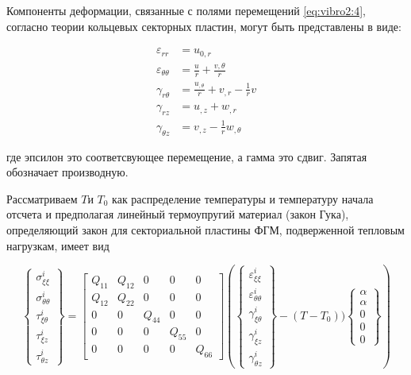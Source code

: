 Компоненты деформации, связанные с полями перемещений \cref{eq:vibro2:4}, согласно теории кольцевых секторных пластин, могут быть представлены в виде:

\begin{equation}
	\label{eq:vibro1:5}
	\begin{split}
		\varepsilon_{rr} &= u_{0, r}
		\\
		\varepsilon_{\theta \theta } &= \frac{u}{r}+\frac{v{,\theta}}{r}
		\\
		\gamma_{r \theta} &= \frac{u_{, \theta}}{r}+v_{, r} - \frac{1}{r}v
		\\
		\gamma_{r z } &= u_{,z}+w_{,r}
		\\
		\gamma_{\theta z} &= v_{,z}-\frac{1}{r} w_{,\theta} 
	\end{split}
\end{equation}

где эпсилон это соответсвующее перемещение, а гамма это сдвиг. Запятая обозначает производную.

Рассматриваем \(T \)и \(T_0\) как распределение температуры и температуру начала отсчета и предполагая линейный термоупругий материал (закон Гука), определяющий закон для секториальной пластины ФГМ, подверженной тепловым нагрузкам, имеет вид

\begin{equation}
	\label{eq:vibro2:6}
	\begin{Bmatrix}
		\sigma_{\xi \xi}^i \\
		\sigma_{\theta \theta}^i \\
		\tau_{\xi \theta}^i \\
		\tau_{\xi z}^i \\
		\tau_{\theta z}^i
	\end{Bmatrix} =
	\begin{bmatrix}
		Q_{11} & Q_{12} & 0       & 0  	  & 0 \\
		Q_{12} & Q_{22} & 0       & 0     & 0 \\
		0     &     0  & Q_{44}  & 0 	  & 0 \\
		0     &     0  & 0       & Q_{55}& 0 \\
		0     &     0  & 0       & 0     &  Q_{66}
	\end{bmatrix}
	\left (
	\begin{Bmatrix}
		\varepsilon_{\xi \xi}^i \\
		\varepsilon_{\theta \theta}^i \\
		\gamma_{\xi \theta}^i \\
		\gamma_{\xi z}^i \\
		\gamma_{\theta z}^i
	\end{Bmatrix}
	- (T-T_0))
		\begin{Bmatrix}
		\alpha \\
		\alpha \\
		0 \\
		0 \\
		0
	\end{Bmatrix}
	\right )
\end{equation}

